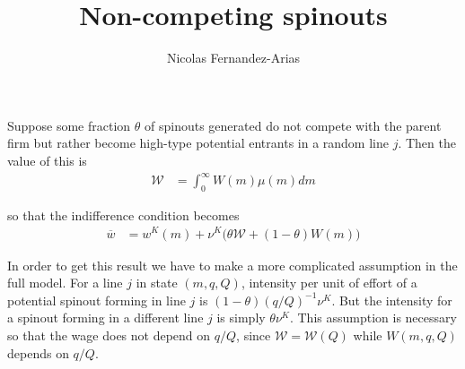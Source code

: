 \documentclass[12pt,english]{article}
\theoremstyle{remark}
\begin{document}
	
	
	
\title{Non-competing spinouts}
\author{Nicolas Fernandez-Arias}
\maketitle

Suppose some fraction $\theta$ of spinouts generated do not compete with the parent firm but rather become high-type potential entrants in a random line $j$. Then the value of this is
\begin{align*}
	\mathcal{W} &= \int_0^{\infty} W(m)\mu(m)dm
\end{align*}

so that the indifference condition becomes
\begin{align*}
	\overline{w} &= w^K(m) + \nu^K \Big( \theta \mathcal{W} + (1-\theta) W(m) \Big)
\end{align*}

In order to get this result we have to make a more complicated assumption in the full model. For a line $j$ in state $(m,q,Q)$, intensity per unit of effort of a potential spinout forming in line $j$ is $(1-\theta) (q/Q)^{-1} \nu^K$. But the intensity for a spinout forming in a different line $j$ is simply $\theta \nu^K$. This assumption is necessary so that the wage does not depend on $q/Q$, since $\mathcal{W} = \mathcal{W}(Q)$ while $W(m,q,Q)$ depends on $q/Q$.
\end{document}
